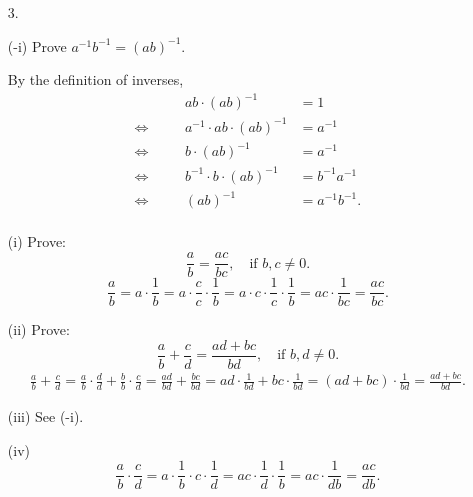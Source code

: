 \documentclass[11pt]{article}
\begin{document}
\begin{enumerate}
    \item[3.]

    \item[(-i)] Prove $a^{-1} b^{-1} = (ab)^{-1}$.

          By the definition of inverses,
          \[
              \begin{alignedat}{2}
                             &  & ab \cdot (ab)^{-1}              & = 1              \\
                  \iff \quad &  & a^{-1} \cdot ab \cdot (ab)^{-1} & = a^{-1}         \\
                  \iff \quad &  & b \cdot (ab)^{-1}               & = a^{-1}         \\
                  \iff \quad &  & b^{-1} \cdot b \cdot (ab)^{-1}  & = b^{-1} a^{-1}  \\
                  \iff \quad &  & (ab)^{-1}                       & = a^{-1} b^{-1}. \\
              \end{alignedat}
          \]

    \item[(i)] Prove:
          \[
              \frac{a}{b} = \frac{ac}{bc}, \quad \text{if $b, c \neq 0$}.
          \]
          \vspace{6pt}
          \[
              \frac{a}{b}
              = a \cdot \frac{1}{b}
              = a \cdot \frac{c}{c} \cdot \frac{1}{b}
              = a \cdot c \cdot \frac{1}{c} \cdot \frac{1}{b}
              = ac \cdot \frac{1}{bc}
              = \frac{ac}{bc}.
          \]

    \item[(ii)] Prove:
          \[
              \frac{a}{b} + \frac{c}{d} = \frac{ad + bc}{bd}, \quad \text{if $b, d \neq 0$}.
          \]
          \vspace{6pt}
          \[
              \begin{aligned}
                  \frac{a}{b} + \frac{c}{d}
                  = \frac{a}{b} \cdot \frac{d}{d} + \frac{b}{b} \cdot \frac{c}{d}
                  = \frac{ad}{bd} + \frac{bc}{bd}
                  = ad \cdot \frac{1}{bd} + bc \cdot \frac{1}{bd}
                  = (ad + bc) \cdot \frac{1}{bd}
                  = \frac{ad + bc}{bd}.
              \end{aligned}
          \]

    \item[(iii)] See (-i).

    \item[(iv)]
          \[
              \frac{a}{b} \cdot \frac{c}{d}
              = a \cdot \frac{1}{b} \cdot c \cdot \frac{1}{d}
              = ac \cdot \frac{1}{d} \cdot \frac{1}{b}
              = ac \cdot \frac{1}{db}
              = \frac{ac}{db}.
          \]


\end{enumerate}
\end{document}
